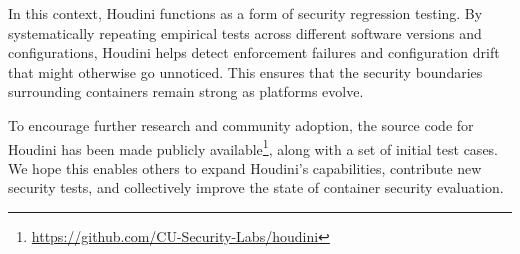 \begin{doublespace}
In this context, Houdini functions as a form of security regression testing. By systematically repeating empirical tests across different software versions and configurations, Houdini helps detect enforcement failures and configuration drift that might otherwise go unnoticed. This ensures that the security boundaries surrounding containers remain strong as platforms evolve.

To encourage further research and community adoption, the source code for Houdini has been made publicly available\footnote{\url{https://github.com/CU-Security-Labs/houdini}}, along with a set of initial test cases. We hope this enables others to expand Houdini’s capabilities, contribute new security tests, and collectively improve the state of container security evaluation.

\end{doublespace}